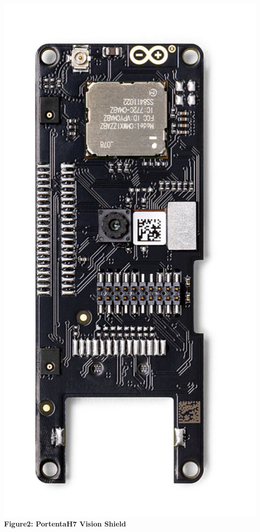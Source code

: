 \documentclass[10pt, a4paper]{beamer}
\begin{document}
\begin{frame}
\begin{columns}
			\centering
			\includegraphics[width=\textwidth]{images/PortentaVisionShield.png}
			\vspace{0.2cm}
			\textbf{Figure2: PortentaH7 Vision Shield}
		\end{columns}
		
	\end{frame}
	
\end{document}
